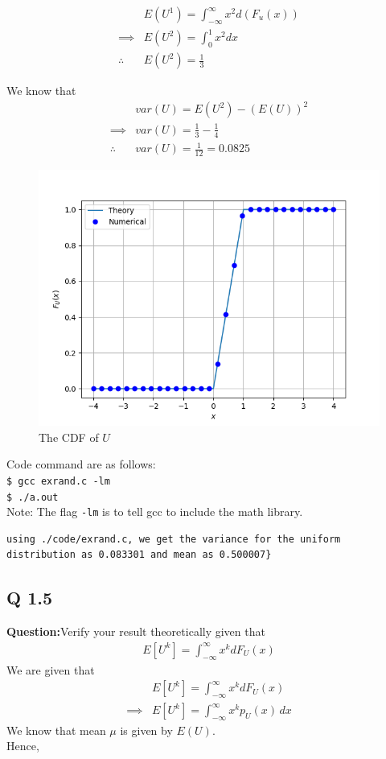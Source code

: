 \documentclass[journal,12pt,twocolumn]{IEEEtran}
\providecommand{\sbrak}[1]{\ensuremath{{}\left[#1\right]}}
\begin{document}
\begin{align}
    &E(U^1) = \int _ {- \infty} ^ {\infty} {x^2 d(F_u(x))} \\
    \implies &E(U^2) = \int _ {0} ^ {1} {x^2 dx} \\
    \therefore &E(U^2) = \frac{1}{3}
\end{align}

We know that
\begin{align}
    &var(U) = E(U^2) - (E(U))^2 \\
    \implies&var(U) = \frac{1}{3} - \frac{1}{4} \\
    \therefore &var(U) = \frac{1}{12} = 0.0825
\end{align}
\begin{figure}[!ht]
\centering
\includegraphics[width=\columnwidth]{./figs/Figure_Q1.png}
\caption{The CDF of $U$}
\label{fig: uniform distribution}
\end{figure}


Code command are as follows:\\
\texttt{\$ gcc exrand.c -lm}\\
\texttt{\$ ./a.out}\\
Note: The flag \texttt{-lm} is to tell gcc to include the math library.\\ 

    \begin{lstlisting}
using ./code/exrand.c, we get the variance for the uniform distribution as 0.083301 and mean as 0.500007}
    \end{lstlisting}
\subsection {Q 1.5}
 \noindent\textbf{Question:}Verify your result theoretically given that
%
    \begin{align}
E\sbrak{U^k} = \int_{-\infty}^{\infty}x^kdF_{U}(x)
    \end{align}We are given that
\begin{align}
            &E[U^k] = \int^{\infty}_{-\infty} x^k dF_U(x)\\
    \implies&E[U^k] = \int^{\infty}_{-\infty} x^k p_U(x) \,dx		\label{eq: Expected}
\end{align}
We know that mean $\mu$ is given by $E(U)$.\\ Hence,
\end{document}
